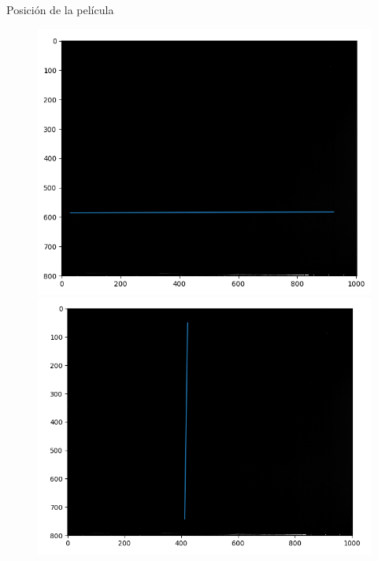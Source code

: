 \documentclass[12pt]{beamer}
\begin{document}
\begin{frame}{Posición de la película}
\begin{figure}[htp]%
	\centering
	\begin{minipage}{0.45\textwidth}
		\includegraphics[width=\textwidth]{images/imagenPerfilMapaCeroHorizontal.png}
	\end{minipage}\hfill
	\begin{minipage}{0.45\textwidth}
		\includegraphics[width=\textwidth]{images/imagenPerfilMapaCeroVertical.png}
	\end{minipage}\par
	\begin{minipage}{0.45\textwidth}

\end{minipage}
\end{figure}
\end{frame}
\end{document}
